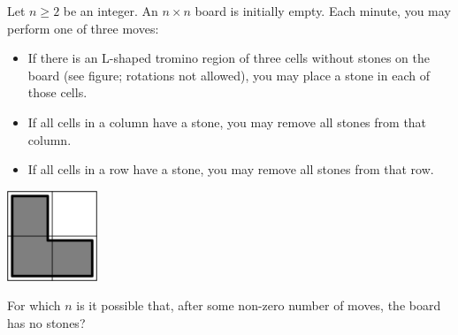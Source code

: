 Let $n \geq 2$ be an integer. An $n \times n$ board is initially empty. Each minute, you may perform one of three moves:
\begin{itemize}
	\item If there is an L-shaped tromino region of three cells without stones on the board (see figure; rotations not allowed), you may place a stone in each of those cells.
	\item If all cells in a column have a stone, you may remove all stones from that column.
	\item If all cells in a row have a stone, you may remove all stones from that row.
\end{itemize}
\begin{center}
\includegraphics[width = 27.0mm]{img/fig0.png}
\end{center}
For which $n$ is it possible that, after some non-zero number of moves, the board has no stones?